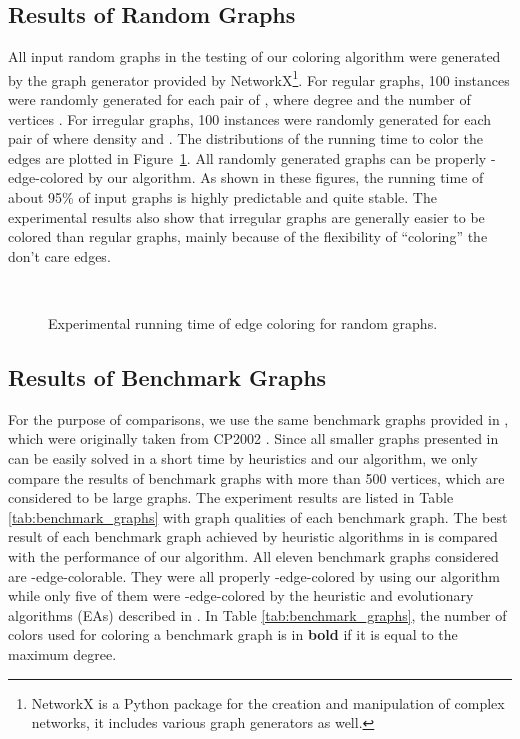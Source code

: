 \documentclass[11pt]{article}
\begin{document}
\subsection{Results of Random Graphs}
All input random graphs in the testing of our coloring algorithm were generated by the graph generator provided by NetworkX\footnote{NetworkX is a Python package for the creation and manipulation of complex networks, it includes various graph generators as well.}. For regular graphs, 100 instances were randomly generated for each pair of , where degree  and the number of vertices . For irregular graphs, 100 instances were randomly generated for each pair of  where density  and . The distributions of the running time to color the edges are plotted in Figure~\ref{fig:random}. All randomly generated graphs can be properly -edge-colored by our algorithm. As shown in these figures, the running time of about 95\% of input graphs is highly predictable and quite stable. The experimental results also show that irregular graphs are generally easier to be colored than regular graphs, mainly because of the flexibility of ``coloring'' the don't care edges.
	
	\begin{figure}[htbp]
		\centering
		\\
		\caption{Experimental running time of edge coloring for random graphs.}
		\label{fig:random}
	\end{figure}

	
\subsection{Results of Benchmark Graphs}


For the purpose of comparisons, we use the same benchmark graphs provided in \cite{hilgemeier2003fast}, which were originally taken from CP2002 \cite{Johnson2002colorinstances}. Since all smaller graphs presented in \cite{hilgemeier2003fast} can be easily solved in a short time by heuristics and our algorithm, we only compare the results of benchmark graphs with more than 500 vertices, which are considered to be large graphs. The experiment results are listed in Table \ref{tab:benchmark_graphs} with graph qualities of each benchmark graph. The best result of each benchmark graph achieved by heuristic algorithms in \cite{hilgemeier2003fast} is compared with the performance of our algorithm. All eleven benchmark graphs considered are -edge-colorable. They were all properly -edge-colored by using our algorithm while only five of them were -edge-colored by the heuristic and evolutionary algorithms (EAs) described in \cite{hilgemeier2003fast}. In Table \ref{tab:benchmark_graphs}, the number of colors used for coloring a benchmark graph  is in {\bf bold} if it is equal to the maximum degree.
\end{document}
